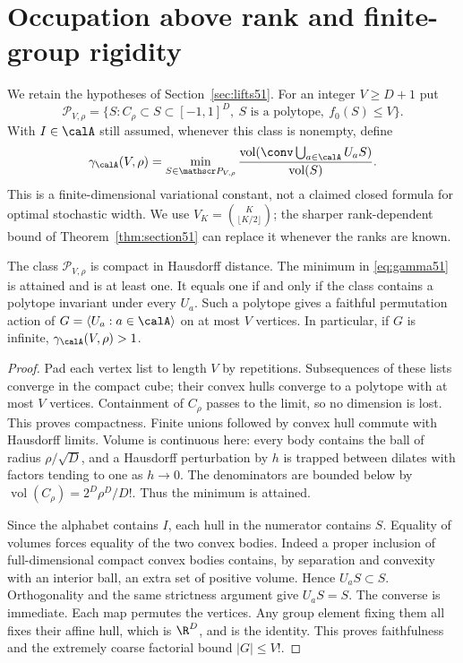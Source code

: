 \section{Occupation above rank and finite-group rigidity}\label{sec:rigidity51}
We retain the hypotheses of Section~\ref{sec:lifts51}. For an integer
$V\ge D+1$ put
\[
 \mathscr P_{V,\rho}=\{S:C_\rho\subset S\subset[-1,1]^D,
                  \ S\text{ is a polytope},\ f_0(S)\le V\}.
\]
With $I\in\calA$ still assumed, whenever this class is nonempty, define
\begin{equation}\label{eq:gamma51}
 \gamma_{\calA}(V,\rho)=
 \min_{S\in\mathscr P_{V,\rho}}
 \frac{\operatorname{vol}(\conv\bigcup_{a\in\calA}U_aS)}
      {\operatorname{vol}(S)}.
\end{equation}
This is a finite-dimensional variational constant, not a claimed
closed formula for optimal stochastic width. We use
$V_K=\binom{K}{\lfloor K/2\rfloor}$; the sharper rank-dependent
bound of Theorem~\ref{thm:section51} can replace it whenever the ranks
are known.

\begin{lemma}\label{lem:compact51}
The class $\mathscr P_{V,\rho}$ is compact in Hausdorff distance.
The minimum in \eqref{eq:gamma51} is attained and is at least one.
It equals one if and only if the class contains a polytope invariant
under every $U_a$. Such a polytope gives a faithful permutation action
of $G=\langle U_a:a\in\calA\rangle$ on at most $V$ vertices.
In particular, if $G$ is infinite, $\gamma_{\calA}(V,\rho)>1$.
\end{lemma}
\begin{proof}
Pad each vertex list to length $V$ by repetitions. Subsequences of
these lists converge in the compact cube; their convex hulls converge
to a polytope with at most $V$ vertices. Containment of $C_\rho$
passes to the limit, so no dimension is lost. This proves compactness.
Finite unions followed by convex hull commute with Hausdorff limits.
Volume is continuous here: every body contains the ball of radius
$\rho/\sqrt D$, and a Hausdorff perturbation by $h$ is trapped
between dilates with factors tending to one as $h\to0$.
The denominators are bounded below by
$\operatorname{vol}(C_\rho)=2^D\rho^D/D!$. Thus the minimum is attained.

Since the alphabet contains $I$, each hull in the numerator contains
$S$. Equality of volumes forces equality of the two convex bodies.
Indeed a proper inclusion of full-dimensional compact convex bodies
contains, by separation and convexity with an interior ball, an extra
set of positive volume. Hence $U_aS\subset S$. Orthogonality and the
same strictness argument give $U_aS=S$. The converse is immediate.
Each map permutes the vertices. Any group element fixing them all
fixes their affine hull, which is $\R^D$, and is the identity. This
proves faithfulness and the extremely coarse factorial bound $|G|\le V!$.
\end{proof}

